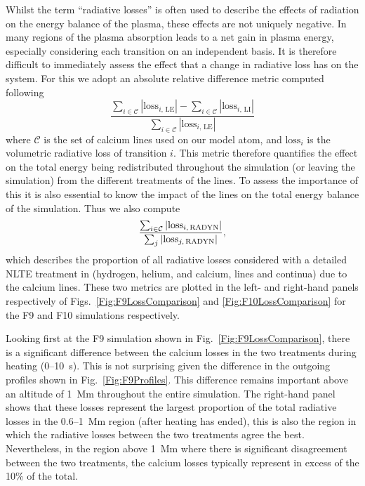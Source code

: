 Whilst the term ``radiative losses'' is often used to describe the effects of radiation on the energy balance of the plasma, these effects are not uniquely negative.
In many regions of the plasma absorption leads to a net gain in plasma energy, especially considering each transition on an independent basis.
It is therefore difficult to immediately assess the effect that a change in radiative loss has on the system.
For this we adopt an absolute relative difference metric computed following
\begin{equation}
    \frac{\sum_{i\in\mathcal{C}}|\mathrm{loss}_{i,\,\mathrm{LE}}| - \sum_{i\in\mathcal{C}}|\mathrm{loss}_{i,\,\mathrm{LI}}|}{\sum_{i\in\mathcal{C}}|\mathrm{loss}_{i,\,\mathrm{LE}}|}
\end{equation}
where $\mathcal{C}$ is the set of calcium lines used on our model atom, and $\mathrm{loss}_i$ is the volumetric radiative loss of transition $i$.
This metric therefore quantifies the effect on the total energy being redistributed throughout the simulation (or leaving the simulation) from the different treatments of the \Caii{} lines.
To assess the importance of this it is also essential to know the impact of the \Caii{} lines on the total energy balance of the simulation.
Thus we also compute
\begin{equation}
    \frac{\sum_{i\in\mathcal{C}}|\mathrm{loss}_{i,\,\mathrm{RADYN{}}}|}{\sum_j|\mathrm{loss}_{j,\,\mathrm{RADYN{}}}|},
\end{equation}
which describes the proportion of all radiative losses considered with a detailed NLTE treatment in \Radyn{} (hydrogen, helium, and calcium, lines and continua) due to the calcium lines.
These two metrics are plotted in the left- and right-hand panels respectively of Figs.~\ref{Fig:F9LossComparison} and \ref{Fig:F10LossComparison} for the F9 and F10 simulations respectively.

Looking first at the F9 simulation shown in Fig.~\ref{Fig:F9LossComparison}, there is a significant difference between the calcium losses in the two treatments during heating (0--\SI{10}{\second}).
This is not surprising given the difference in the outgoing profiles shown in Fig.~\ref{Fig:F9Profiles}.
This difference remains important above an altitude of \SI{1}{\mega\metre} throughout the entire simulation.
The right-hand panel shows that these losses represent the largest proportion of the total radiative losses in the 0.6--\SI{1}{\mega\metre} region (after heating has ended), this is also the region in which the radiative losses between the two treatments agree the best.
Nevertheless, in the region above \SI{1}{\mega\metre} where there is significant disagreement between the two treatments, the calcium losses typically represent in excess of the 10\% of the total.


